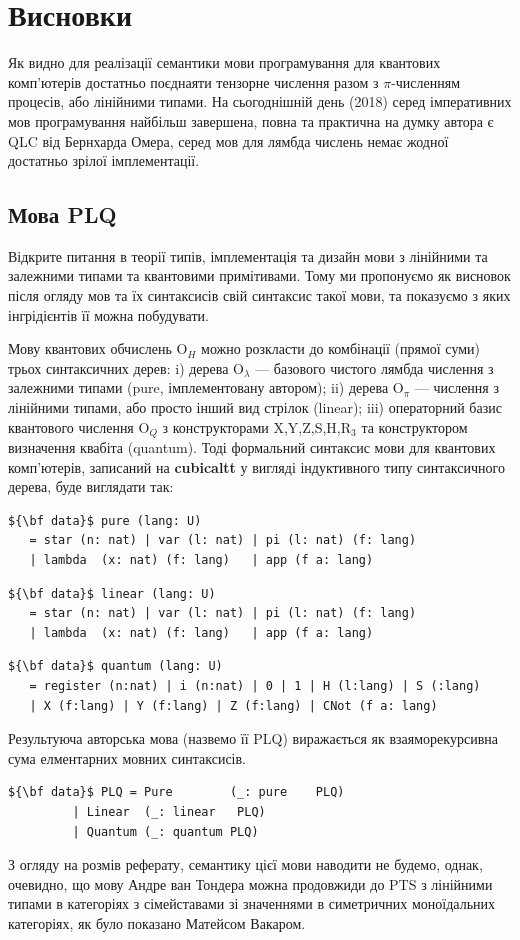 \documentclass{article}
\theoremstyle{definition}
\begin{document}
\newpage
\section{Висновки}
Як видно для реалізації семантики мови програмування для квантових
комп'ютерів достатньо поєднаяти тензорне числення разом з $\pi$-численням процесів,
або лінійними типами. На сьогоднішній день (2018) серед імперативних мов програмування
найбільш завершена, повна та практична на думку автора є QLC від Бернхарда Омера, серед
мов для лямбда числень немає жодної достатньо зрілої імплементації.

\subsection{Мова PLQ}
Відкрите питання в теорії типів, імплементація та дизайн мови
з лінійними та залежними типами та квантовими примітивами.
Тому ми пропонуємо як висновок після огляду мов та їх синтаксисів свій синтаксис такої мови,
та показуємо з яких інгрідієнтів її можна побудувати.

Мову квантових обчислень O$_H$ можно розкласти до комбінації (прямої суми) трьох синтаксичних дерев:
  i) дерева O$_\lambda$ --- базового чистого лямбда числення з залежними типами (pure, імплементовану автором\cite{Tonpa18});
 ii) дерева O$_\pi$ --- числення з лінійними типами, або просто інший вид стрілок (linear);
iii) операторний базис квантового числення O$_Q$ з
     конструкторами X,Y,Z,S,H,R$_3$ та конструктором визначення квабіта (quantum).
Тоді формальний синтаксис мови для квантових комп'ютерів,
записаний на {\bf cubicaltt}\cite{Mortberg17} у вигляді індуктивного типу синтаксичного дерева,
буде виглядати так:
\begin{lstlisting}[mathescape=true]
${\bf data}$ pure (lang: U)
   = star (n: nat) | var (l: nat) | pi (l: nat) (f: lang)
   | lambda  (x: nat) (f: lang)   | app (f a: lang)
\end{lstlisting}
\begin{lstlisting}[mathescape=true]
${\bf data}$ linear (lang: U)
   = star (n: nat) | var (l: nat) | pi (l: nat) (f: lang)
   | lambda  (x: nat) (f: lang)   | app (f a: lang)
\end{lstlisting}
\begin{lstlisting}[mathescape=true]
${\bf data}$ quantum (lang: U)
   = register (n:nat) | i (n:nat) | 0 | 1 | H (l:lang) | S (:lang)
   | X (f:lang) | Y (f:lang) | Z (f:lang) | CNot (f a: lang)
\end{lstlisting}
Результуюча авторська мова (назвемо її PLQ) виражається
як взаяморекурсивна сума елментарних мовних синтаксисів.
\begin{lstlisting}[mathescape=true]
${\bf data}$ PLQ = Pure        (_: pure    PLQ)
         | Linear  (_: linear   PLQ)
         | Quantum (_: quantum PLQ)
\end{lstlisting}
З огляду на розмів реферату, семантику цієї мови наводити не будемо,
однак, очевидно, що мову Андре ван Тондера можна продовжиди до
PTS з лінійними типами в категоріях з сімейставами зі значеннями в симетричних моноїдальних категоріях,
як було показано Матейсом Вакаром\cite{Vakar2014}.
\newpage


\end{document}
